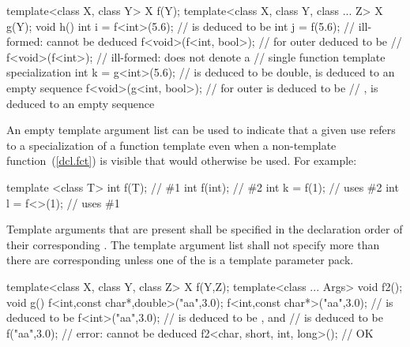 \begin{codeblock}
template<class X, class Y> X f(Y);
template<class X, class Y, class ... Z> X g(Y);
void h() {
  int i = f<int>(5.6);          //  is deduced to be 
  int j = f(5.6);               // ill-formed:  cannot be deduced
  f<void>(f<int, bool>);        //  for outer  deduced to be
                                // 
  f<void>(f<int>);              // ill-formed:  does not denote a
                                // single function template specialization
  int k = g<int>(5.6);          //  is deduced to be double,  is deduced to an empty sequence
  f<void>(g<int, bool>);        //  for outer  is deduced to be
                                // ,  is deduced to an empty sequence
}
\end{codeblock}
\exitexample

\pnum
\enternote
An empty template argument list can be used to indicate that a given
use refers to a specialization of a function template even when a
non-template function~(\ref{dcl.fct}) is visible that would otherwise be used.
For example:

\begin{codeblock}
template <class T> int f(T);    // \#1
int f(int);                     // \#2
int k = f(1);                   // uses \#2
int l = f<>(1);                 // uses \#1
\end{codeblock}
\exitnote

\pnum
Template arguments that are present shall be specified in the declaration
order of their corresponding
.
The template argument list shall not specify more
than there are corresponding
unless one of the  is a template
parameter pack.
\enterexample

\begin{codeblock}
template<class X, class Y, class Z> X f(Y,Z);
template<class ... Args> void f2();
void g() {
  f<int,const char*,double>("aa",3.0);
  f<int,const char*>("aa",3.0);       //  is deduced to be 
  f<int>("aa",3.0);             //  is deduced to be , and
                                //  is deduced to be 
  f("aa",3.0);                  // error:  cannot be deduced
  f2<char, short, int, long>(); // OK
}
\end{codeblock}
\exitexample


